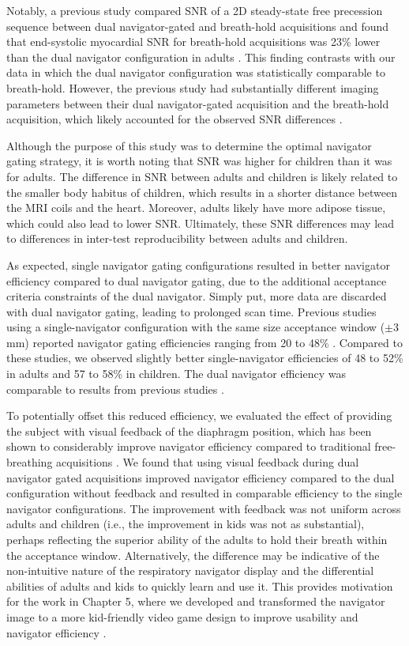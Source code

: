 	Notably, a previous study compared SNR of a 2D steady-state free precession sequence between dual navigator-gated and breath-hold acquisitions and found that end-systolic myocardial SNR for breath-hold acquisitions was 23\% lower than the dual navigator configuration in adults \cite{Peters2008}. This finding contrasts with our data in which the dual navigator configuration was statistically comparable to breath-hold. However, the previous study had substantially different imaging parameters between their dual navigator-gated acquisition and the breath-hold acquisition, which likely accounted for the observed SNR differences \cite{Peters2008}.
	
	Although the purpose of this study was to determine the optimal navigator gating strategy, it is worth noting that SNR was higher for children than it was for adults. The difference in SNR between adults and children is likely related to the smaller body habitus of children, which results in a shorter distance between the MRI coils and the heart. Moreover, adults likely have more adipose tissue, which could also lead to lower SNR. Ultimately, these SNR differences may lead to differences in inter-test reproducibility between adults and children.
	
	As expected, single navigator gating configurations resulted in better navigator efficiency compared to dual navigator gating, due to the additional acceptance criteria constraints of the dual navigator. Simply put, more data are discarded with dual navigator gating, leading to prolonged scan time. Previous studies using a single-navigator configuration with the same size acceptance window ($\pm$3 mm) reported navigator gating efficiencies ranging from 20 to 48\% \cite{Zhong2010a,Feuerlein2009,Abd-Elmoniem2011}. Compared to these studies, we observed slightly better single-navigator efficiencies of 48 to 52\% in adults and 57 to 58\% in children. The dual navigator efficiency was comparable to results from previous studies \cite{Peters2008}.
	
	To potentially offset this reduced efficiency, we evaluated the effect of providing the subject with visual feedback of the diaphragm position, which has been shown to considerably improve navigator efficiency compared to traditional free-breathing acquisitions \cite{Feuerlein2009}. We found that using visual feedback during dual navigator gated acquisitions improved navigator efficiency compared to the dual configuration without feedback and resulted in comparable efficiency to the single navigator configurations. The improvement with feedback was not uniform across adults and children (i.e., the improvement in kids was not as substantial), perhaps reflecting the superior ability of the adults to hold their breath within the acceptance window. Alternatively, the difference may be indicative of the non-intuitive nature of the respiratory navigator display and the differential abilities of adults and kids to quickly learn and use it. This provides motivation for the work in Chapter 5, where we developed and transformed the navigator image to a more kid-friendly video game design to improve usability and navigator efficiency \cite{Hamlet2016a}.
	
